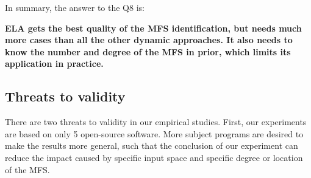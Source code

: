 \documentclass[10pt,journal,compsoc]{IEEEtran}
\begin{document}
{%
%



In summary, the answer to the Q8 is:

\textbf{ ELA gets the best quality of the MFS identification, but needs much more cases than all the other dynamic approaches.  It also needs to know the number and degree of the MFS in prior, which limits its application in practice.}

}




\subsection{Threats to validity}

There are two threats to validity in our empirical studies. First, our experiments are based on only 5 open-source software. More subject programs are desired to make the results more general, such that the conclusion of our experiment can reduce the impact caused by specific input space and specific degree or location of the MFS.
\end{document}
